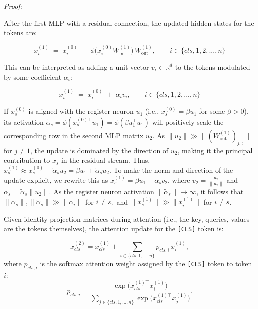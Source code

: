\documentclass{article}
\begin{document}
\textit{Proof:}

After the first MLP with a residual connection, the updated hidden states for the tokens are: 

\begin{equation}
  x^{(1)}_{i} \;=\; x^{(0)}_{i} \;+\; \phi\big(x^{(0)}_{i} W_{\text{in}}^{(1)}\big)\, W_{\text{out}}^{(1)},
  \qquad i \in \{cls, 1, 2, ..., n\}
\end{equation}



This can be interpreted as adding a unit vector $v_i \in\mathbb{R}^d$ to the tokens modulated by some coefficient $\alpha_i$: 

\begin{equation}
  x^{(1)}_{i} \;=\; x^{(0)}_{i} \;+\; \alpha_iv_i,
  \qquad i \in \{cls, 1, 2, ..., n\}
\end{equation}




If $x^{(0)}_s$ is aligned with the register neuron $u_1$ (i.e., $x^{(0)}_s = \beta u_1$ for some $\beta > 0$), its activation $\tilde{\alpha}_s = \phi(x_s^{(0)\top} u_1) = \phi(\beta{u_1^\top} u_1)$ will positively scale the corresponding row in the second MLP matrix $u_2$. As $\|u_2\|\gg\|(W_{\text{out}}^{(1)})_{j,:}\|$ for $j \neq 1$, the update is dominated by the direction of $u_2$, making it the principal contribution to $x_s$ in the residual stream. Thus, $ x^{(1)}_{s} \approx x^{(0)}_{s}+\tilde{\alpha}_su_2 = \beta u_1+\tilde{\alpha}_su_2$. To make the norm and direction of the update explicit, we rewrite this as $ x^{(1)}_{s}  = \beta u_1+\alpha_s v_2$, where $v_2 = \frac{u_2}{\|u_2\|}$ and $\alpha_s = \tilde{\alpha}_s\|u_2\|.$ As the register neuron activation \( \|\tilde{\alpha}_s\| \to \infty \), it follows that $\|\alpha_s\|,\|\tilde{\alpha}_s\| \gg \|\alpha_i\|$ for $i\neq s,$ and $\|x^{(1)}_{s}\| \gg \|x^{(1)}_{i}\|$ for $i\neq s$. 


Given identity projection matrices during attention (i.e., the key, queries, values are the tokens themselves), the attention update for the \texttt{[CLS]} token is: 

\begin{equation}
x_{cls}^{(2)} 
= x_{cls}^{(1)} 
+ \sum_{i \in \{cls,1,\dots,n\}} 
p_{cls,i}\, x_i^{(1)},
\end{equation}
where $p_{cls,i}$ is the softmax attention weight assigned by the \texttt{[CLS]} token to token $i$:
\begin{equation}
p_{cls,i} 
= \frac{\exp\!\big(x_{cls}^{(1)\top} x_i^{(1)}\big)}
{\sum_{j \in \{cls,1,\dots,n\}} 
\exp\!\big(x_{cls}^{(1)\top} x_j^{(1)}\big)}.
\end{equation}
\end{document}
